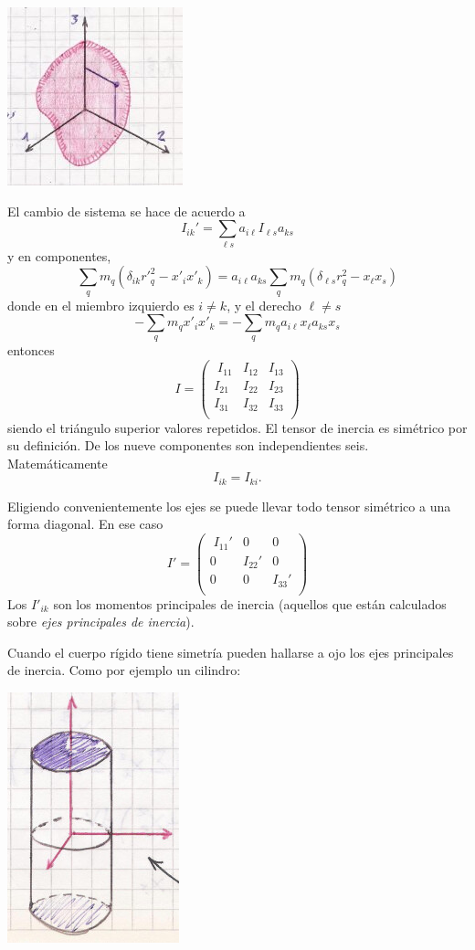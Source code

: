 \documentclass[10pt,oneside]{CBFT_book}
\begin{document}
\includegraphics[scale=0.4]{images/fig_mc_rigid_body_inercia1.jpg}

El cambio de sistema se hace de acuerdo a
\[
	I_{ik}' = \sum_{\ell s} a_{i\ell} I_{\ell s} a_{ks}
\]
y en componentes,
\[
	\sum_q m_q ( \delta_{ik} {r'}^2_q - x'_i x'_k ) =  a_{i\ell} a_{ks} \sum_q m_q
	( \delta_{\ell s} r^2_q - x_\ell x_s )
\]
donde en el miembro izquierdo es $i \neq k$, y el derecho $\ell \neq s$
\[
	- \sum_q m_q x'_i x'_k =  - \sum_q m_q a_{i\ell} x_\ell a_{ks}  x_s 
\]
entonces 
\[
	I =
	\begin{pmatrix} \;
		I_{11} & I_{12} & I_{13} \\
		I_{21} & I_{22} & I_{23} \\ 
		I_{31} & I_{32} & I_{33} \\
	\end{pmatrix}
\]
siendo el triángulo superior valores repetidos. El tensor de inercia es simétrico por su 
definición. De los nueve componentes son independientes seis. Matemáticamente
\[
	I_{ik} = I_{ki}.
\]

Eligiendo convenientemente los ejes se puede llevar todo tensor simétrico a una forma
diagonal. En ese caso
\[
	I' =
	\begin{pmatrix} \;
		I_{11}' & 0 & 0 \\
		0 & I_{22}' & 0 \\ 
		0 & 0 & I_{33}' \\
	\end{pmatrix}
\]
Los $I'_{ik}$ son los momentos principales de inercia (aquellos que están calculados sobre
{\it ejes principales de inercia}).

Cuando el cuerpo rígido tiene simetría pueden hallarse a ojo los ejes principales de inercia.
Como por ejemplo un cilindro:

\includegraphics[scale=0.4]{images/fig_mc_rigid_body_ejesinercia0.jpg}
\end{document}
